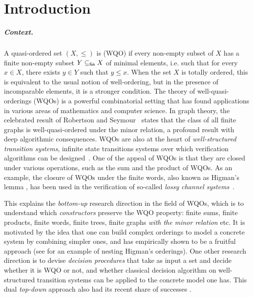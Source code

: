 \section{Introduction}
\label{sec:introduction}

\subparagraph{Context.} 
\AP
A quasi-ordered set $(X, \leq)$ is  (WQO)
if every non-empty subset of $X$ has a finite non-empty subset $Y \subseteq_{\mathsf{fin}} X$ of
minimal elements, i.e. such that for every $x \in X$, there exists
$y \in Y$ such that $y \leq x$. When the set $X$ is totally ordered,
this is equivalent to the usual notion of well-ordering, but in the presence of 
incomparable elements, it is a stronger condition.
The theory of well-quasi-orderings (WQOs) is a powerful
combinatorial setting that has found applications in various areas of
mathematics and computer science. In graph theory, the celebrated result of
Robertson and Seymour~\cite{ROBSEY04} states that the class of all finite
graphs is well-quasi-ordered under the minor relation, a profound result with
deep algorithmic consequences. WQOs are also at the heart of
\emph{well-structured transition systems}, infinite state transitions systems
over which verification algorithms can be designed~\cite{ABDU96,ABDU98}. One of
the appeal of WQOs is that they are closed under various operations, such as
the sum and the product of WQOs. As an example, the closure of WQOs under the
finite words, also known as Higman's lemma \cite{HIG52}, has been used in the
verification of so-called \emph{lossy channel systems}~\cite{ABDU93}. 

This explains the \emph{bottom-up} research direction in the field of WQOs,
which is to understand which \emph{constructors} preserve the WQO property:
finite sums, finite products, finite words, finite trees, finite graphs
\emph{with the minor relation} etc. It is motivated by the idea that one can
build complex orderings to model a concrete system by combining simpler ones,
and has empirically shown to be a fruitful approach (see \cite{HSS13} for an
example of nesting Higman's orderings). One other research direction is to
devise \emph{decision procedures} that take as input a set and decide whether
it is WQO or not, and whether classical decision algorithm on well-structured
transition systems can be applied to the concrete model one has. This dual
\emph{top-down} approach also had its recent share of successes
\cite{ALM17,FINGU19,LOPEZ24}.


